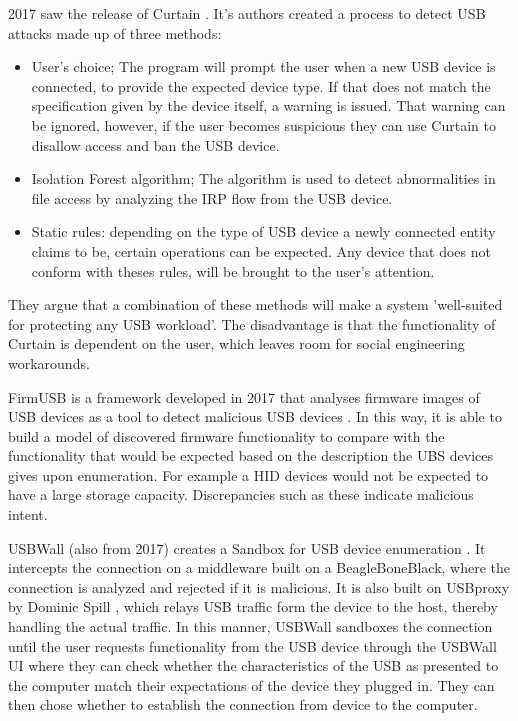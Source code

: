 2017 saw the release of Curtain \cite{fuCurtainKeepYour2017}. It's authors created a process to detect USB attacks made up of three methods:
\begin{itemize}
    \item User's choice; The program will prompt the user when a new USB device is connected, to provide the expected device type. If that does not match the specification given by the device itself, a warning is issued. That warning can be ignored, however, if the user becomes suspicious they can use Curtain to disallow access and ban the USB device.
    \item Isolation Forest algorithm; The algorithm is used to detect abnormalities in file access by analyzing the IRP flow from the USB device. 
    \item Static rules: depending on the type of USB device a newly connected entity claims to be, certain operations can be expected. Any device that does not conform with theses rules, will be brought to the user's attention. 
\end{itemize}
They argue that a combination of these methods will make a system 'well-suited for protecting any USB workload'.  The disadvantage is that the functionality of Curtain is dependent on the user, which leaves room for social engineering workarounds.  

FirmUSB is a framework developed in 2017 that analyses firmware images of USB devices as a tool to detect malicious USB devices \cite{hernandezFirmUSBVettingUSB2017}. In this way, it is able to build a model of discovered firmware functionality to compare with the functionality that would be expected based on the description the UBS devices gives upon enumeration. For example a HID devices would not be expected to have a large storage capacity. Discrepancies such as these indicate malicious intent. 

USBWall (also from 2017) creates a Sandbox for USB device enumeration \cite{kangUSBWallNovelSecurity2017}. It intercepts the connection on a middleware built on a BeagleBoneBlack, where the connection is analyzed and rejected if it is malicious. It is also built on USBproxy by Dominic Spill \cite{dominicspillShmooCon2014Open2014}, which relays USB traffic form the device to the host, thereby handling the actual traffic. In this manner, USBWall sandboxes the connection until the user requests functionality from the USB device through the USBWall UI where they can check whether the characteristics of the USB as presented to the computer match their expectations of the device they plugged in. They can then chose whether to establish the connection from device to the computer.  

